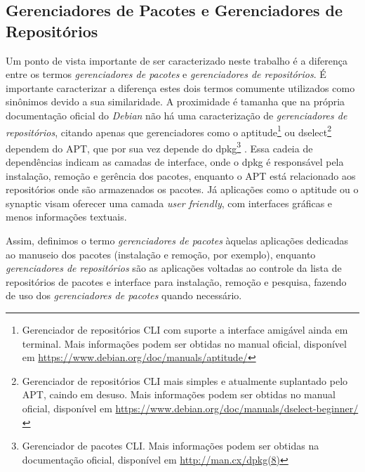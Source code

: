
\subsection*{Gerenciadores de Pacotes e Gerenciadores de Repositórios} %
\label{sec:gerenciadores}


Um ponto de vista importante de ser caracterizado neste trabalho é a diferença entre os termos \textit{ gerenciadores de pacotes} e \textit{gerenciadores de repositórios}.
É importante caracterizar a diferença estes dois termos comumente utilizados como sinônimos devido a sua similaridade. A proximidade é tamanha que na própria documentação oficial do \textit{Debian} não há uma caracterização de \textit{gerenciadores de repositórios}, citando apenas que gerenciadores como o {\code aptitude}\footnote{Gerenciador de repositórios CLI com suporte a interface amigável ainda em terminal. Mais informações podem ser obtidas no manual oficial, disponível em \url{https://www.debian.org/doc/manuals/aptitude/}} ou {\code dselect}\footnote{Gerenciador de repositórios CLI mais simples e atualmente suplantado pelo {\code APT}, caindo em desuso. Mais informações podem ser obtidas no manual oficial, disponível em \url{https://www.debian.org/doc/manuals/dselect-beginner/}} dependem do {\code APT}, que por sua vez depende do {\code dpkg}\footnote{Gerenciador de pacotes CLI. Mais informações podem ser obtidas na documentação oficial, disponível em \url{http://man.cx/dpkg(8)}} \cite{debian-faq}. Essa cadeia de dependências indicam as camadas de interface, onde o {\code dpkg} é responsável pela instalação, remoção e gerência dos pacotes, enquanto o {\code APT} está relacionado aos repositórios onde são armazenados os pacotes. Já aplicações como o {\code aptitude} ou o {\code synaptic} visam oferecer uma camada \textit{user friendly}, com interfaces gráficas e menos informações textuais.

Assim, definimos o termo \textit{gerenciadores de pacotes} àquelas aplicações dedicadas ao manuseio dos pacotes (instalação e remoção, por exemplo), enquanto \textit{gerenciadores de repositórios} são as aplicações voltadas ao controle da lista de repositórios de pacotes e interface  para instalação, remoção e pesquisa, fazendo de uso dos \textit{gerenciadores de pacotes} quando necessário.

